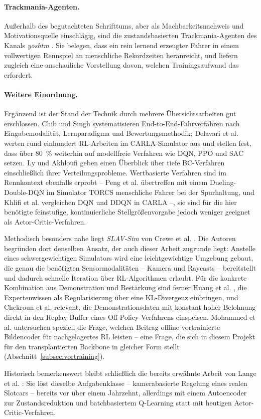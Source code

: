 \paragraph{Trackmania-Agenten.}
Außerhalb des begutachteten Schrifttums, aber als Machbarkeitsnachweis und Motivationsquelle einschlägig, sind die zustandsbasierten Trackmania-Agenten des Kanals \textit{yoshtm} \cite{yoshtm}. Sie belegen, dass ein rein lernend erzeugter Fahrer in einem vollwertigen Rennspiel an menschliche Rekordzeiten heranreicht, und liefern zugleich eine anschauliche Vorstellung davon, welchen Trainingsaufwand das erfordert.

\paragraph{Weitere Einordnung.}
Ergänzend ist der Stand der Technik durch mehrere Übersichtsarbeiten gut erschlossen. Chib und Singh \cite{chib2023recent} systematisieren End-to-End-Fahrverfahren nach Eingabemodalität, Lernparadigma und Bewertungsmethodik; Delavari et al. \cite{delavari2025comprehensive} werten rund einhundert \ac{RL}-Arbeiten im CARLA-Simulator aus und stellen fest, dass über \SI{80}{\percent} weiterhin auf modellfreie Verfahren wie \ac{DQN}, \ac{PPO} und \ac{SAC} setzen. Ly und Akhloufi \cite{ly2021learning} geben einen Überblick über tiefe \ac{BC}-Verfahren einschließlich ihrer Verteilungsprobleme. Wertbasierte Verfahren sind im Rennkontext ebenfalls erprobt -- Peng et al. \cite{peng2021end} übertreffen mit einem Dueling-Double-\acs{DQN} im Simulator TORCS menschliche Fahrer bei der Spurhaltung, und Khlifi et al. \cite{khlifi2025novel} vergleichen \acs{DQN} und \ac{DDQN} in CARLA --, sie sind für die hier benötigte feinstufige, kontinuierliche Stellgrößenvorgabe jedoch weniger geeignet als Actor-Critic-Verfahren.

Methodisch besonders nahe liegt \emph{SLAV-Sim} von Crewe et al. \cite{crewe2023slav}. Die Autoren begründen dort denselben Ansatz, der auch dieser Arbeit zugrunde liegt: Anstelle eines schwergewichtigen Simulators wird eine leichtgewichtige Umgebung gebaut, die genau die benötigten Sensormodalitäten -- Kamera und Raycasts -- bereitstellt und dadurch schnelle Iteration über \ac{RL}-Algorithmen erlaubt. Für die konkrete Kombination aus Demonstration und Bestärkung sind ferner Huang et al. \cite{huang2021efficient}, die Expertenwissen als Regularisierung über eine KL-Divergenz einbringen, und Chekroun et al. \cite{chekroun2023gri} relevant, die Demonstrationsdaten mit konstant hoher Belohnung direkt in den Replay-Buffer eines Off-Policy-Verfahrens einspeisen. Mohammed et al. \cite{mohammed2024examination} untersuchen speziell die Frage, welchen Beitrag offline vortrainierte Bildencoder für nachgelagertes \ac{RL} leisten -- eine Frage, die sich in diesem Projekt für den transplantierten Backbone in gleicher Form stellt (Abschnitt~\ref{subsec:vortraining}).

Historisch bemerkenswert bleibt schließlich die bereits erwähnte Arbeit von Lange et al. \cite{lange2012autonomous}: Sie löst dieselbe Aufgabenklasse -- kamerabasierte Regelung eines realen Slotcars -- bereits vor über einem Jahrzehnt, allerdings mit einem Autoencoder zur Zustandsreduktion und batchbasiertem Q-Learning statt mit heutigen Actor-Critic-Verfahren.
